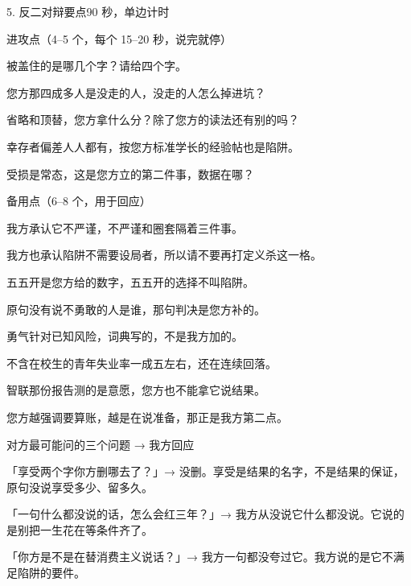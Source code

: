 \documentclass[script,con]{debate}
\begin{document}
\begin{stage}{5. 反二对辩要点}{90 秒，单边计时}
\begin{points}{进攻点（4–5 个，每个 15–20 秒，说完就停）}
\item 被盖住的是哪几个字？请给四个字。
\item 您方那四成多人是没走的人，没走的人怎么掉进坑？
\item 省略和顶替，您方拿什么分？除了您方的读法还有别的吗？
\item 幸存者偏差人人都有，按您方标准学长的经验帖也是陷阱。
\item 受损是常态，这是您方立的第二件事，数据在哪？
\end{points}
\begin{points}{备用点（6–8 个，用于回应）}
\item 我方承认它不严谨，不严谨和圈套隔着三件事。
\item 我方也承认陷阱不需要设局者，所以请不要再打定义杀这一格。
\item 五五开是您方给的数字，五五开的选择不叫陷阱。
\item 原句没有说不勇敢的人是谁，那句判决是您方补的。
\item 勇气针对已知风险，词典写的，不是我方加的。
\item 不含在校生的青年失业率一成五左右，还在连续回落。
\item 智联那份报告测的是意愿，您方也不能拿它说结果。
\item 您方越强调要算账，越是在说准备，那正是我方第二点。
\end{points}
\begin{points}{对方最可能问的三个问题 → 我方回应}
\item 「享受两个字你方删哪去了？」→ 没删。享受是结果的名字，不是结果的保证，原句没说享受多少、留多久。
\item 「一句什么都没说的话，怎么会红三年？」→ 我方从没说它什么都没说。它说的是别把一生花在等条件齐了。
\item 「你方是不是在替消费主义说话？」→ 我方一句都没夸过它。我方说的是它不满足陷阱的要件。
\end{points}
\end{stage}
\end{document}
